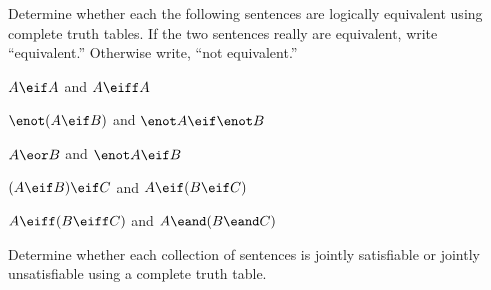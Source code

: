 \problempart
\label{pr.TT.equiv2}
Determine whether each the following sentences are logically equivalent using complete truth tables. If the two sentences really are equivalent, write ``equivalent.'' Otherwise write, ``not equivalent.''
\begin{compactlist}
\item $A\eif A$ and $A \eiff A$
\item $\enot(A \eif B)$ and $\enot A \eif \enot B$
\item $A \eor B$ and $\enot A \eif B$
\item$(A \eif B) \eif C$ and $A \eif (B \eif C)$
\item $A \eiff (B \eiff C)$ and $A \eand (B \eand C)$
\end{compactlist}


\problempart
\label{pr.TT.satisfiable2}
Determine whether each collection of sentences is jointly satisfiable or jointly unsatisfiable using a complete truth table.
